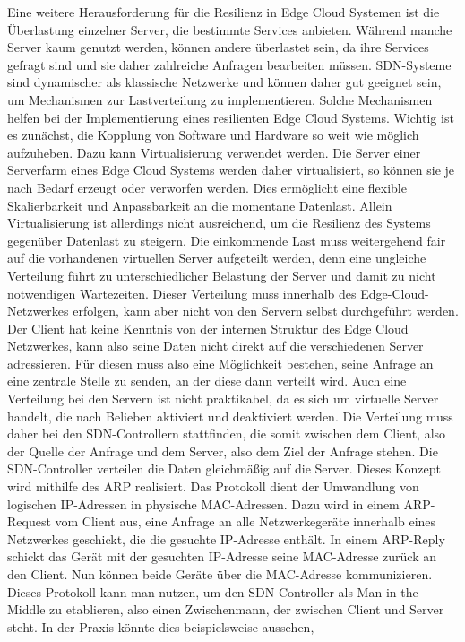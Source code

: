 Eine weitere Herausforderung für die Resilienz in Edge Cloud Systemen ist die Überlastung einzelner Server, die bestimmte Services anbieten. Während manche Server kaum genutzt werden, können andere überlastet sein, 
da ihre Services gefragt sind und sie daher zahlreiche Anfragen bearbeiten müssen. \ac{SDN}-Systeme sind dynamischer als klassische Netzwerke und können daher gut geeignet sein, 
um Mechanismen zur Lastverteilung zu implementieren. Solche Mechanismen helfen bei der Implementierung eines resilienten Edge Cloud Systems. Wichtig ist es zunächst, 
die Kopplung von Software und Hardware so weit wie möglich aufzuheben. Dazu kann Virtualisierung verwendet werden. Die Server einer Serverfarm eines Edge Cloud Systems werden daher virtualisiert, 
so können sie je nach Bedarf erzeugt oder verworfen werden. Dies ermöglicht eine flexible Skalierbarkeit und Anpassbarkeit an die momentane Datenlast. Allein Virtualisierung ist allerdings nicht ausreichend, 
um die Resilienz des Systems gegenüber Datenlast zu steigern. Die einkommende Last muss weitergehend fair auf die vorhandenen virtuellen Server aufgeteilt werden, 
denn eine ungleiche Verteilung führt zu unterschiedlicher Belastung der Server und damit zu nicht notwendigen Wartezeiten. Dieser Verteilung muss innerhalb des Edge-Cloud-Netzwerkes erfolgen, 
kann aber nicht von den Servern selbst durchgeführt werden. Der Client hat keine Kenntnis von der internen Struktur des Edge Cloud Netzwerkes, kann also seine Daten nicht direkt auf die verschiedenen Server adressieren. 
Für diesen muss also eine Möglichkeit bestehen, seine Anfrage an eine zentrale Stelle zu senden, an der diese dann verteilt wird. Auch eine Verteilung bei den Servern ist nicht praktikabel, 
da es sich um virtuelle Server handelt, die nach Belieben aktiviert und deaktiviert werden. Die Verteilung muss daher bei den \ac{SDN}-Controllern stattfinden, die somit zwischen dem Client, 
also der Quelle der Anfrage und dem Server, also dem Ziel der Anfrage stehen. Die \ac{SDN}-Controller verteilen die Daten gleichmäßig auf die Server. Dieses Konzept wird mithilfe des \ac{ARP} realisiert. 
Das Protokoll dient der Umwandlung von logischen \ac{IP}-Adressen in physische \ac{MAC}-Adressen. Dazu wird in einem \ac{ARP}-Request vom Client aus, eine Anfrage an alle Netzwerkegeräte innerhalb eines Netzwerkes geschickt, 
die die gesuchte \ac{IP}-Adresse enthält. In einem \ac{ARP}-Reply schickt das Gerät mit der gesuchten \ac{IP}-Adresse seine \ac{MAC}-Adresse zurück an den Client. Nun können beide Geräte über die \ac{MAC}-Adresse kommunizieren. 
Dieses Protokoll kann man nutzen, um den \ac{SDN}-Controller als Man-in-the Middle zu etablieren, also einen Zwischenmann, der zwischen Client und Server steht. In der Praxis könnte dies beispielsweise aussehen, 
